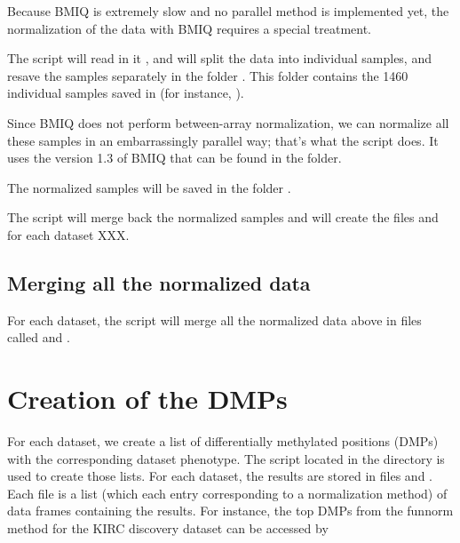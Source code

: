 \documentclass[12pt]{article}
\begin{document}
Because BMIQ is extremely slow and no parallel method is implemented yet, the normalization of the data with BMIQ requires a special treatment. 

The script  will read in it , and will split the data into individual samples, and resave the samples separately in the folder . This folder contains the 1460 individual samples saved in  (for instance, ). 

Since BMIQ does not perform between-array normalization, we can normalize all these samples in an embarrassingly parallel way; that's what the script  does. It uses the version 1.3 of BMIQ that can be found in the  folder.

The normalized samples will be saved in the folder . 

The script  will merge back the normalized samples and will create the files  and  for each dataset XXX. 

\subsection{Merging all the normalized data}

For each dataset, the script  will merge all the normalized data above in files called  and . 

\section{Creation of the DMPs}

For each dataset, we create a list of differentially methylated positions (DMPs) with the corresponding dataset phenotype. The script  located in the directory  is used to create those lists. For each dataset, the results are stored in files  and . Each file is a list (which each entry corresponding to a normalization method) of data frames containing the results. For instance, the top DMPs  from the funnorm method for the KIRC discovery dataset can be accessed by 
\begin{knitrout}
\color{fgcolor}\begin{kframe}
\begin{alltt}
\hlstd{(}\hlstd{))}
\hlstd{(}\hlstd{)}
\hlopt{$}
\end{alltt}
\end{kframe}
\end{knitrout}
\end{document}

